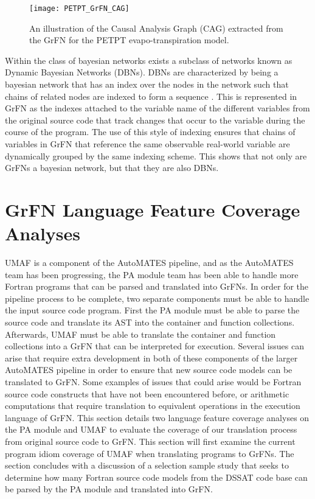 \begin{figure}[!tbp]
  \centering
  \texttt{[image: PETPT\_GrFN\_CAG]}
  \caption[PETPT GrFN Causal Analysis Graph]{An illustration of the Causal Analysis Graph (CAG) extracted from the GrFN for the PETPT evapo-transpiration model.}
  \label{fig:petpt_cag}
\end{figure}

Within the class of bayesian networks exists a subclass of networks known as Dynamic Bayesian Networks (DBNs).
DBNs are characterized by being a bayesian network that has an index over the nodes in the network such that chains of related nodes are indexed to form a sequence \citep{pearl2009causality}.
This is represented in GrFN as the indexes attached to the variable name of the different variables from the original source code that track changes that occur to the variable during the course of the program.
The use of this style of indexing ensures that chains of variables in GrFN that reference the same observable real-world variable are dynamically grouped by the same indexing scheme.
This shows that not only are GrFNs a bayesian network, but that they are also DBNs.

\section{GrFN Language Feature Coverage Analyses\label{sec:grfn_eval}}
UMAF is a component of the AutoMATES pipeline, and as the AutoMATES team has been progressing, the PA module team has been able to handle more Fortran programs that can be parsed and translated into GrFNs.
In order for the pipeline process to be complete, two separate components must be able to handle the input source code program.
First the PA module must be able to parse the source code and translate its AST into the container and function collections.
Afterwards, UMAF must be able to translate the container and function collections into a GrFN that can be interpreted for execution.
Several issues can arise that require extra development in both of these components of the larger AutoMATES pipeline in order to ensure that new source code models can be translated to GrFN.
Some examples of issues that could arise would be Fortran source code constructs that have not been encountered before, or arithmetic computations that require translation to equivalent operations in the execution language of GrFN.
This section details two language feature coverage analyses on the PA module and UMAF to evaluate the coverage of our translation process from original source code to GrFN.
This section will first examine the current program idiom coverage of UMAF when translating programs to GrFNs.
The section concludes with a discussion of a selection sample study that seeks to determine how many Fortran source code models from the DSSAT code base can be parsed by the PA module and translated into GrFN.

